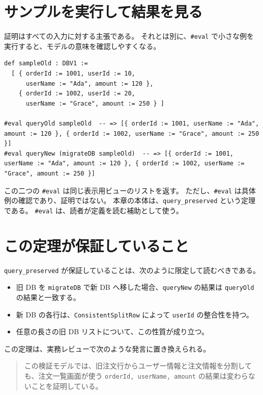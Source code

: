 \section{サンプルを実行して結果を見る}

証明はすべての入力に対する主張である。
それとは別に、\texttt{\#eval} で小さな例を実行すると、モデルの意味を確認しやすくなる。

\begin{listing}[htbp]
\begin{verbatim}
def sampleOld : DBV1 :=
  [ { orderId := 1001, userId := 10,
      userName := "Ada", amount := 120 },
    { orderId := 1002, userId := 20,
      userName := "Grace", amount := 250 } ]

#eval queryOld sampleOld  -- => [{ orderId := 1001, userName := "Ada", amount := 120 }, { orderId := 1002, userName := "Grace", amount := 250 }]
#eval queryNew (migrateDB sampleOld)  -- => [{ orderId := 1001, userName := "Ada", amount := 120 }, { orderId := 1002, userName := "Grace", amount := 250 }]
\end{verbatim}
\caption{小さなサンプル DB の評価}
\label{lst:ch26-sample-eval}
\end{listing}

この二つの \texttt{\#eval} は同じ表示用ビューのリストを返す。
ただし、\texttt{\#eval} は具体例の確認であり、証明ではない。
本章の本体は、\texttt{query\_preserved} という定理である。
\texttt{\#eval} は、読者が定義を読む補助として使う。

\section{この定理が保証していること}

\texttt{query\_preserved} が保証していることは、次のように限定して読むべきである。

\begin{itemize}
\item 旧 DB を \texttt{migrateDB} で新 DB へ移した場合、\texttt{queryNew} の結果は \texttt{queryOld} の結果と一致する。
\item 新 DB の各行は、\texttt{ConsistentSplitRow} によって \texttt{userId} の整合性を持つ。
\item 任意の長さの旧 DB リストについて、この性質が成り立つ。
\end{itemize}

この定理は、実務レビューで次のような発言に置き換えられる。

\begin{quote}
この検証モデルでは、旧注文行からユーザー情報と注文情報を分割しても、注文一覧画面が使う \texttt{orderId, userName, amount} の結果は変わらないことを証明している。
\end{quote}

